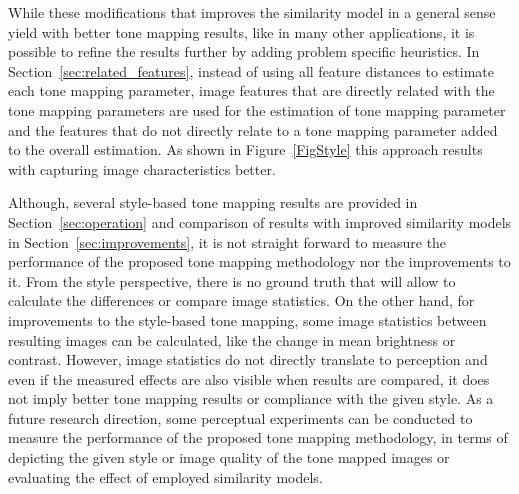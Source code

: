 While these modifications that improves the similarity model in a general sense yield with better tone mapping results, like in many other applications, it is possible to refine the results further by adding problem specific heuristics. In Section~\ref{sec:related_features}, instead of using all feature distances to estimate each tone mapping parameter, image features that are directly related with the tone mapping parameters are used for the estimation of tone mapping parameter and the features that do not directly relate to a tone mapping parameter added to the overall estimation. As shown in Figure~\ref{FigStyle} this approach results with capturing image characteristics better. 

Although, several style-based tone mapping results are provided in Section~\ref{sec:operation} and comparison of results with improved similarity models in Section~\ref{sec:improvements}, it is not straight forward to measure the performance of the proposed tone mapping methodology nor the improvements to it. From the style perspective, there is no ground truth that will allow to calculate the differences or compare image statistics. On the other hand, for improvements to the style-based tone mapping, some image statistics between resulting images can be calculated, like the change in mean brightness or contrast. However, image statistics do not directly translate to perception and even if the measured effects are also visible when results are compared, it does not imply better tone mapping results or compliance with the given style. As a future research direction, some perceptual experiments can be conducted to measure the performance of the proposed tone mapping methodology, in terms of depicting the given style or image quality of the tone mapped images or evaluating the effect of employed similarity models.

